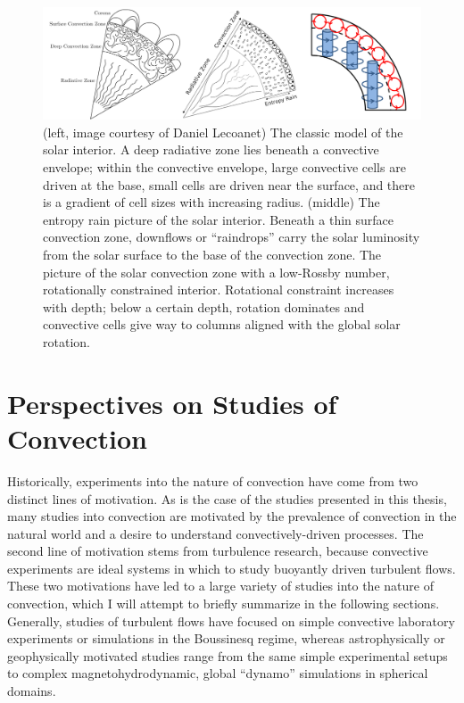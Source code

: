 \begin{figure}[t!]
\includegraphics[width=\textwidth]{./figs/intro/conundrum_explanations.pdf}
\caption[Schematics of hypotheses that solve the convective conundrum.]
{
	(left, image courtesy of Daniel Lecoanet) The classic model of the solar interior.
	A deep radiative zone lies beneath a convective envelope; within the convective envelope, large convective cells are driven at the base, small cells are driven near the surface, and there is a gradient of cell sizes with increasing radius.
	(middle) The entropy rain picture of the solar interior.
	Beneath a thin surface convection zone, downflows or ``raindrops'' carry the solar luminosity from the solar surface to the base of the convection zone. 
	\citep[right, Fig.~3c of][]{featherstone&hindman2016b} The picture of the solar convection zone with a low-Rossby number, rotationally constrained interior.
	Rotational constraint increases with depth; below a certain depth, rotation dominates and convective cells give way to columns aligned with the global solar rotation.
	\label{fig:conundrum_solns} 
}
\end{figure}


\section{Perspectives on Studies of Convection}
Historically, experiments into the nature of convection have come from two distinct lines of motivation.
As is the case of the studies presented in this thesis, many studies into convection are motivated by the prevalence of convection in the natural world and a desire to understand convectively-driven processes.
The second line of motivation stems from turbulence research, because convective experiments are ideal systems in which to study buoyantly driven turbulent flows.
These two motivations have led to a large variety of studies into the nature of convection, which I will attempt to briefly summarize in the following sections.
Generally, studies of turbulent flows have focused on simple convective laboratory experiments or simulations in the Boussinesq regime, whereas astrophysically or geophysically motivated studies range from the same simple experimental setups to complex magnetohydrodynamic, global ``dynamo'' simulations in spherical domains.

